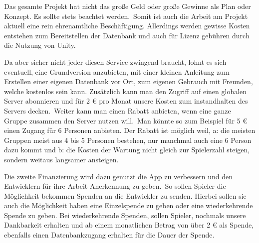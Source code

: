 \usepackage{eurosym}Das gesamte Projekt hat nicht das große Geld oder große Gewinne als Plan oder Konzept.
Es sollte stets beachtet werden.\ Somit ist auch die Arbeit am Projekt aktuell eine rein ehrenamtliche Beschäftigung.
Allerdings werden gewisse Kosten entstehen zum Bereitstellen der Datenbank und auch für Lizenz gebühren durch die
Nutzung von Unity.

Da aber sicher nicht jeder diesen Service zwingend braucht, lohnt es sich eventuell, eine Grundversion anzubieten,
mit einer kleinen Anleitung zum Erstellen einer eigenen Datenbank vor Ort, zum eigenen Gebrauch mit Freunden, welche
kostenlos sein kann.\newline
Zusätzlich kann man den Zugriff auf einen globalen Server abonnieren und für 2 € pro Monat unsere Kosten zum
instandhalten des Servers decken.\ Weiter kann man einen Rabatt anbieten, wenn eine ganze Gruppe zusammen den
Server nutzen will.\ Man könnte so zum Beispiel für 5 € einen Zugang für 6 Personen anbieten.
Der Rabatt ist möglich weil, a: die meisten Gruppen meist aus 4 bis 5 Personen bestehen, nur manchmal auch eine 6 Person
dazu kommt und b: die Kosten der Wartung nicht gleich zur Spielerzahl steigen, sondern weitaus langsamer ansteigen.

Die zweite Finanzierung wird dazu genutzt die App zu verbessern und den Entwicklern für ihre Arbeit Anerkennung zu
geben.\ So sollen Spieler die Möglichkeit bekommen Spenden an die Entwickler zu senden.
Hierbei sollen sie auch die Möglichkeit haben eine Einzelspende zu geben oder eine wiederkehrende Spende zu geben.
Bei wiederkehrende Spenden, sollen Spieler, nochmals unsere Dankbarkeit erhalten und ab
einem monatlichen Betrag von über 2 € als Spende, ebenfalls einen Datenbankzugang erhalten für die Dauer
der Spende.